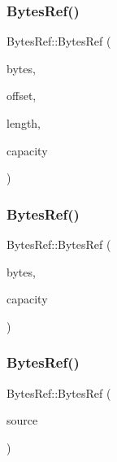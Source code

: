 \subsubsection{\texorpdfstring{Bytes\+Ref()}{BytesRef()}\hspace{0.1cm}{\footnotesize\ttfamily [3/8]}}
{\footnotesize\ttfamily Bytes\+Ref\+::\+Bytes\+Ref (\begin{DoxyParamCaption}\item[{const char $\ast$}]{bytes,  }\item[{const uint32\+\_\+t}]{offset,  }\item[{const uint32\+\_\+t}]{length,  }\item[{const uint32\+\_\+t}]{capacity }\end{DoxyParamCaption})}

\mbox{\label{classlucene_1_1core_1_1util_1_1BytesRef_aad74198593bb0663f505c2751940b68b}} 
\subsubsection{\texorpdfstring{Bytes\+Ref()}{BytesRef()}\hspace{0.1cm}{\footnotesize\ttfamily [4/8]}}
{\footnotesize\ttfamily Bytes\+Ref\+::\+Bytes\+Ref (\begin{DoxyParamCaption}\item[{const char $\ast$}]{bytes,  }\item[{const uint32\+\_\+t}]{capacity }\end{DoxyParamCaption})}

\mbox{\label{classlucene_1_1core_1_1util_1_1BytesRef_ab49453782bcf181a44128375bcada802}} 
\subsubsection{\texorpdfstring{Bytes\+Ref()}{BytesRef()}\hspace{0.1cm}{\footnotesize\ttfamily [5/8]}}
{\footnotesize\ttfamily Bytes\+Ref\+::\+Bytes\+Ref (\begin{DoxyParamCaption}\item[{const \mbox{\hyperlink{classlucene_1_1core_1_1util_1_1BytesRef}{Bytes\+Ref}} \&}]{source }\end{DoxyParamCaption})}


